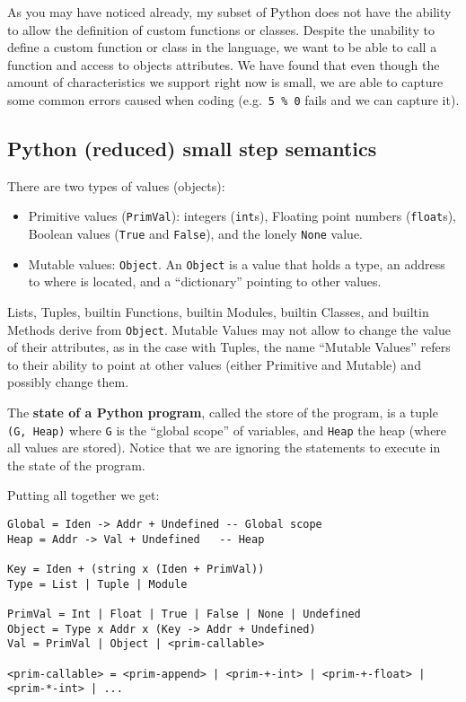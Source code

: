 {}

As you may have noticed already, my subset of Python does not have the
ability to allow the definition of custom functions or classes. Despite
the unability to define a custom function or class in the language, we
want to be able to call a function and access to objects attributes. We
have found that even though the amount of characteristics we support
right now is small, we are able to capture some common errors caused
when coding (e.g.~\texttt{5\ \%\ 0} fails and we can capture it).

\subsection{Python (reduced) small step semantics}
\label{python-reduced-small-step-semantics}

There are two types of values (objects):

\begin{itemize}
\tightlist
\item
  Primitive values (\texttt{PrimVal}): integers (\texttt{int}s),
  Floating point numbers (\texttt{float}s), Boolean values
  (\texttt{True} and \texttt{False}), and the lonely \texttt{None}
  value.
\item
  Mutable values: \texttt{Object}. An \texttt{Object} is a value that
  holds a type, an address to where is located, and a
  \enquote{dictionary} pointing to other values.
\end{itemize}

Lists, Tuples, builtin Functions, builtin Modules, builtin Classes, and
builtin Methods derive from \texttt{Object}. Mutable Values may not
allow to change the value of their attributes, as in the case with
Tuples, the name \enquote{Mutable Values} refers to their ability to
point at other values (either Primitive and Mutable) and possibly change
them.

The \textbf{state of a Python program}, called the store of the program,
is a tuple \texttt{(G,\ Heap)} where \texttt{G} is the \enquote{global
scope} of variables, and \texttt{Heap} the heap (where all values are
stored). Notice that we are ignoring the statements to execute in the
state of the program.

Putting all together we get:

\begin{verbatim}
Global = Iden -> Addr + Undefined -- Global scope
Heap = Addr -> Val + Undefined   -- Heap

Key = Iden + (string x (Iden + PrimVal))
Type = List | Tuple | Module

PrimVal = Int | Float | True | False | None | Undefined
Object = Type x Addr x (Key -> Addr + Undefined)
Val = PrimVal | Object | <prim-callable>

<prim-callable> = <prim-append> | <prim-+-int> | <prim-+-float> | <prim-*-int> | ...
\end{verbatim}

